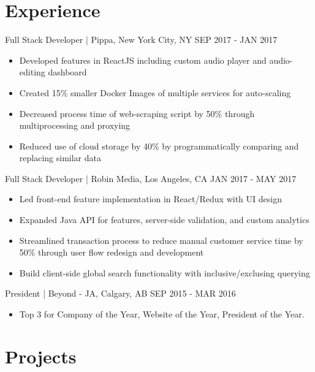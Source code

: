 \documentclass[]{friggeri-cv}
\begin{document}
\section{Experience}

\begin{entrylist}
	\entry
	{Full Stack Developer | \normalfont Pippa, New York City, NY}
	{SEP 2017 - JAN 2017}
	{
		\begin{itemize}[leftmargin=*]\itemsep0.1cm
			\vspace{-0.3cm}
			\item Developed features in ReactJS including custom audio player and audio-editing dashboard
			\item Created 15\% smaller Docker Images of multiple services for auto-scaling
			\item Decreased process time of web-scraping script by 50\% through multiprocessing and proxying
			\item Reduced use of cloud storage by 40\% by programmatically comparing and replacing similar data 
		\end{itemize}
	}
	\entry
	{Full Stack Developer | \normalfont Robin Media, Los Angeles, CA}
	{JAN 2017 - MAY 2017}
	{
		\begin{itemize}[leftmargin=*]\itemsep0.1cm
			\vspace{-0.3cm}
			\item Led front-end feature implementation in React/Redux with UI design 
			\item Expanded Java API for features, server-side validation, and custom analytics
			\item Streamlined transaction process to reduce manual customer service time by 50\% through user flow redesign and development
			\item Build client-side global search functionality with inclusive/exclusing querying
		\end{itemize}
	}
	\entry
	{President | \normalfont Beyond - JA, Calgary, AB}
	{SEP 2015 - MAR 2016}
	{
		\begin{itemize}[leftmargin=*]\itemsep0.1cm
			\vspace{-0.3cm}
			\item Top 3 for Company of the Year, Website of the Year, President of the Year.
		\end{itemize}
	}
\end{entrylist}

\section{Projects}
\end{document}
